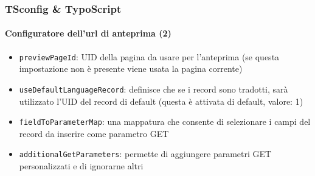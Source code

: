 \begin{frame}[fragile]
	\frametitle{TSconfig \& TypoScript}
	\framesubtitle{Configuratore dell'url di anteprima (2)}

	\begin{itemize}
		\item \texttt{previewPageId}:\newline
			\smaller
				UID della pagina da usare per l'anteprima\newline
				(se questa impostazione non è presente viene usata la pagina corrente)
			\normalsize
		\item \texttt{useDefaultLanguageRecord}:\newline
			\smaller
				definisce che se i record sono tradotti, sarà utilizzato l'UID del record di default\newline
				(questa è attivata di default, valore: 1)
			\normalsize
		\item \texttt{fieldToParameterMap}:\newline
			\smaller
				una mappatura che consente di selezionare i campi del record da inserire come parametro GET
			\normalsize
		\item \texttt{additionalGetParameters}:\newline
			\smaller
				permette di aggiungere parametri GET personalizzati e di ignorarne altri
			\normalsize
	\end{itemize}

\end{frame}

